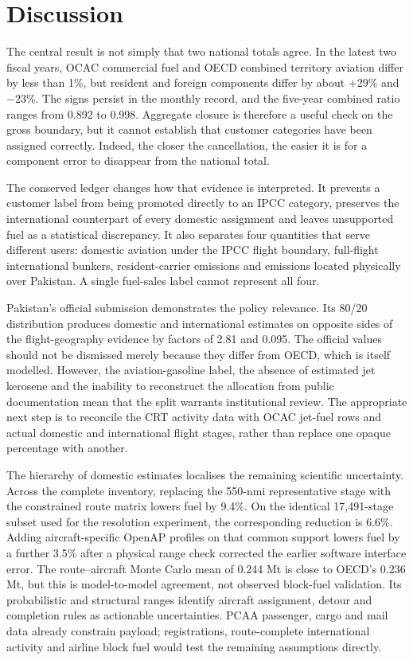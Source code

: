 \section{Discussion}
\label{sec:discussion}

The central result is not simply that two national totals agree. In the latest two fiscal
years, OCAC commercial fuel and OECD combined territory aviation differ by less than 1\%, but
resident and foreign components differ by about $+29$\% and $-23$\%. The signs persist in the
monthly record, and the five-year combined ratio ranges from 0.892 to 0.998. Aggregate closure
is therefore a useful check on the gross boundary, but it cannot establish that customer
categories have been assigned correctly. Indeed, the closer the cancellation, the easier it
is for a component error to disappear from the national total.

The conserved ledger changes how that evidence is interpreted. It prevents a customer label
from being promoted directly to an IPCC category, preserves the international counterpart of
every domestic assignment and leaves unsupported fuel as a statistical discrepancy. It also
separates four quantities that serve different users: domestic aviation under the IPCC flight
boundary, full-flight international bunkers, resident-carrier emissions and emissions located
physically over Pakistan. A single fuel-sales label cannot represent all four.

Pakistan's official submission demonstrates the policy relevance. Its 80/20 distribution
produces domestic and international estimates on opposite sides of the flight-geography
evidence by factors of 2.81 and 0.095. The official values should not be dismissed merely
because they differ from OECD, which is itself modelled. However, the aviation-gasoline label,
the absence of estimated jet kerosene and the inability to reconstruct the allocation from
public documentation mean that the split warrants institutional review. The appropriate next
step is to reconcile the CRT activity data with OCAC jet-fuel rows and actual domestic and
international flight stages, rather than replace one opaque percentage with another.

The hierarchy of domestic estimates localises the remaining scientific uncertainty. Across the
complete inventory, replacing the 550-nmi representative stage with the constrained route
matrix lowers fuel by 9.4\%. On the identical 17,491-stage subset used for the resolution
experiment, the corresponding reduction is 6.6\%. Adding aircraft-specific OpenAP profiles on
that common support lowers fuel by a further 3.5\% after a physical range check corrected the
earlier software interface error. The route--aircraft Monte Carlo mean of 0.244 Mt \COtwo{} is
close to OECD's 0.236 Mt, but this is model-to-model agreement, not observed block-fuel
validation. Its
probabilistic and structural ranges identify aircraft assignment, detour and completion rules
as actionable uncertainties. PCAA passenger, cargo and mail data already constrain payload;
registrations, route-complete international activity and airline block fuel would test the
remaining assumptions directly.

